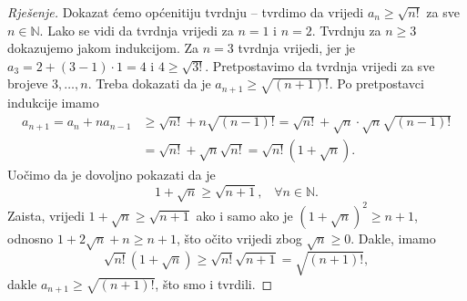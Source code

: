 \begin{proof}[Rješenje]
Dokazat ćemo općenitiju tvrdnju -- tvrdimo da vrijedi $a_n\geq \sqrt{n!}$ za sve $n\in \mathbb{N}$. Lako se vidi da tvrdnja vrijedi za $n=1$ i $n=2$. Tvrdnju za $n\geq 3$ dokazujemo jakom indukcijom. Za $n=3$ tvrdnja vrijedi, jer je $a_3=2+(3-1)\cdot 1=4$ i $4\geq \sqrt{3!}$. Pretpostavimo da tvrdnja vrijedi za sve brojeve $3, \dots, n$. Treba dokazati da je $a_{n+1}\geq\sqrt{(n+1)!}$. Po pretpostavci indukcije imamo
\begin{align*}
a_{n+1}=a_n+na_{n-1}&\geq \sqrt{n!}+n\sqrt{(n-1)!}=\sqrt{n!}+\sqrt{n}\cdot\sqrt{n}\sqrt{(n-1)!}\\
&=\sqrt{n!}+\sqrt{n}\sqrt{n!}=\sqrt{n!}(1+\sqrt{n}).
\end{align*}
Uočimo da je dovoljno pokazati da je $$1+\sqrt{n}\geq \sqrt{n+1}, \;\;\;\forall n\in \mathbb{N}.$$ 
Zaista, vrijedi $1+\sqrt{n}\geq \sqrt{n+1}$ ako i samo ako je $(1+\sqrt{n})^2\geq n+1$, odnosno $1+2\sqrt{n}+n\geq n+1$, što očito vrijedi zbog $\sqrt{n}\geq 0$. Dakle, imamo 
$$\sqrt{n!}(1+\sqrt{n})\geq \sqrt{n!}\sqrt{n+1}=\sqrt{(n+1)!},$$
dakle $a_{n+1}\geq \sqrt{(n+1)!}$, što smo i tvrdili.
\end{proof}
